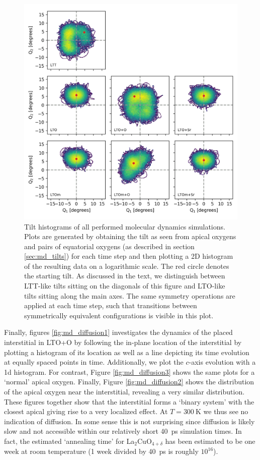 \begin{figure}
	\centering
	\includegraphics[width=\textwidth]{fig/md/Q1_Q2_all.png}
	\caption[MD Q1 Q2 All sims]{Tilt histograms of all performed molecular dynamics simulations. Plots are generated by obtaining the tilt as seen from apical oxygens and pairs of equatorial oxygens (as described in section \ref{sec:md_tilts}) for each time step and then plotting a 2D histogram of the resulting data on a logarithmic scale. The red circle denotes the starting tilt. As discussed in the text, we distinguish between LTT-like tilts sitting on the diagonals of this figure and LTO-like tilts sitting along the main axes. The same symmetry operations are applied at each time step, such that transitions between symmetrically equivalent configurations is visible in this plot.}
	\label{fig:md_q1_q2_all}
\end{figure}

Finally, figures \ref{fig:md_diffusion1} investigates the dynamics of the placed interstitial in LTO+O by following the in-plane location of the interstitial by plotting a histogram of its location as well as a line depicting its time evolution at equally spaced points in time. Additionally, we plot the $c$-axis evolution with a 1d histogram. For contrast, Figure \ref{fig:md_diffusion3} shows the same plots for a `normal' apical oxygen. Finally, Figure \ref{fig:md_diffusion2} shows the distribution of the apical oxygen near the interstitial, revealing a very similar distribution. These figures together show that the interstitial forms a `binary system' with the closest apical giving rise to a very localized effect. At $T=\SI{300}{\kelvin}$ we thus see no indication of diffusion. In some sense this is not surprising since diffusion is likely slow and not accessible within our relatively short \SI{40}{\pico\second} simulation times. In fact, the estimated `annealing time' for La$_2$CuO$_{4+\delta}$ has been estimated to be one week at room temperature \cite{Lee2004} (1 week divided by \SI{40}{\pico\second} is roughly $10^16$).

